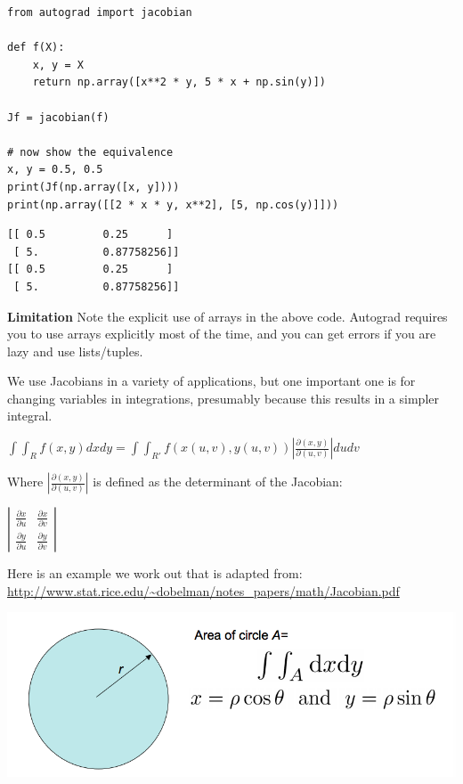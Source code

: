 \documentclass[11pt]{article}
\begin{document}
\begin{verbatim}
from autograd import jacobian

def f(X):
    x, y = X
    return np.array([x**2 * y, 5 * x + np.sin(y)])

Jf = jacobian(f)

# now show the equivalence
x, y = 0.5, 0.5
print(Jf(np.array([x, y])))
print(np.array([[2 * x * y, x**2], [5, np.cos(y)]]))
\end{verbatim}

\begin{verbatim}
[[ 0.5         0.25      ]
 [ 5.          0.87758256]]
[[ 0.5         0.25      ]
 [ 5.          0.87758256]]

\end{verbatim}

\textbf{Limitation} Note the explicit use of arrays in the above code. Autograd requires you to use arrays explicitly most of the time, and you can get errors if you are lazy and use lists/tuples.


We use Jacobians in a variety of applications, but one important one is for changing variables in integrations, presumably because this results in a simpler integral.

\(\int \int_R f(x, y) dx dy = \int \int_{R'} f(x(u, v), y(u, v)) \left|\frac{\partial(x, y)}{\partial(u, v)}\right| du dv\)


Where \(\left|\frac{\partial(x, y)}{\partial(u, v)}\right|\) is defined as the determinant of the Jacobian:

\(\left|\begin{array}{cc}
 \frac{\partial x}{\partial u} & \frac{\partial x}{\partial v} \\
 \frac{\partial y}{\partial u} & \frac{\partial y}{\partial v}
 \end{array}\right|\)


Here is an example we work out that is adapted from: \url{http://www.stat.rice.edu/\~dobelman/notes\_papers/math/Jacobian.pdf}

\begin{center}
\includegraphics[width=.9\linewidth]{./screenshots/date-24-11-2018-time-12-16-14.png}
\end{center}
\end{document}
